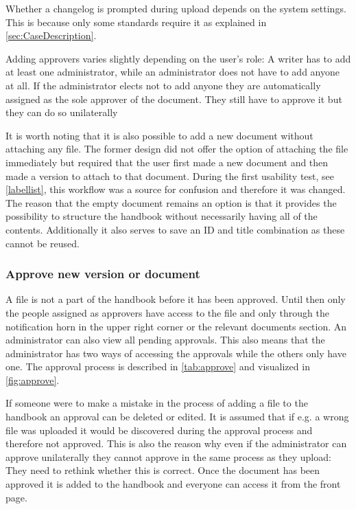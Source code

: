 


Whether a changelog is prompted during upload depends on the system settings.
This is because only some standards require it as explained in \cref{sec:CaseDescription}.

Adding approvers varies slightly depending on the user's role:
A writer has to add at least one administrator, while an administrator does not have to add anyone at all.
If the administrator elects not to add anyone they are automatically assigned as the sole approver of the document.
They still have to approve it but they can do so unilaterally

It is worth noting that it is also possible to add a new document without attaching any file.
The former design did not offer the option of attaching the file immediately but required that the user first made a new document and then made a version to attach to that document.
During the first usability test, see \cref{labellist}, this workflow was a source for confusion and therefore it was changed.
The reason that the empty document remains an option is that it provides the possibility to structure the handbook without necessarily having all of the contents.
Additionally it also serves to save an ID and title combination as these cannot be reused. 

\subsubsection{Approve new version or document} \label{sec:approve}
A file is not a part of the handbook before it has been approved.
Until then only the people assigned as approvers have access to the file and only through the notification horn in the upper right corner or the relevant documents section.
An administrator can also view all pending approvals.
This also means that the administrator has two ways of accessing the approvals while the others only have one.
The approval process is described in \cref{tab:approve} and visualized in \cref{fig:approve}.




If someone were to make a mistake in the process of adding a file to the handbook an approval can be deleted or edited.
It is assumed that if e.g. a wrong file was uploaded it would be discovered during the approval process and therefore not approved.
This is also the reason why even if the administrator can approve unilaterally they cannot approve in the same process as they upload:
They need to rethink whether this is correct.
Once the document has been approved it is added to the handbook and everyone can access it from the front page.

